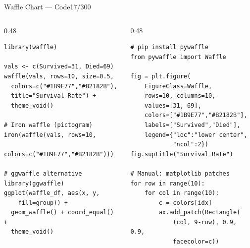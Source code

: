 \documentclass[10pt]{beamer}
\newcommand{\smark}[1]{\hfill{\scriptsize\color{codegray}#1}}
\begin{document}
\begin{frame}[fragile]{Waffle Chart --- Code}\smark{17/300}
\begin{columns}[T]
\begin{column}{0.48\textwidth}
\begin{lstlisting}[style=Rstyle]
library(waffle)

vals <- c(Survived=31, Died=69)
waffle(vals, rows=10, size=0.5,
  colors=c("#1B9E77","#B2182B"),
  title="Survival Rate") +
  theme_void()

# Iron waffle (pictogram)
iron(waffle(vals, rows=10,
  colors=c("#1B9E77","#B2182B")))

# ggwaffle alternative
library(ggwaffle)
ggplot(waffle_df, aes(x, y,
    fill=group)) +
  geom_waffle() + coord_equal() +
  theme_void()
\end{lstlisting}
\end{column}
\begin{column}{0.48\textwidth}
\begin{lstlisting}[style=Pystyle]
# pip install pywaffle
from pywaffle import Waffle

fig = plt.figure(
    FigureClass=Waffle,
    rows=10, columns=10,
    values=[31, 69],
    colors=["#1B9E77","#B2182B"],
    labels=["Survived","Died"],
    legend={"loc":"lower center",
            "ncol":2})
fig.suptitle("Survival Rate")

# Manual: matplotlib patches
for row in range(10):
    for col in range(10):
        c = colors[idx]
        ax.add_patch(Rectangle(
            (col, 9-row), 0.9, 0.9,
            facecolor=c))
\end{lstlisting}
\end{column}
\end{columns}
\end{frame}
\end{document}
